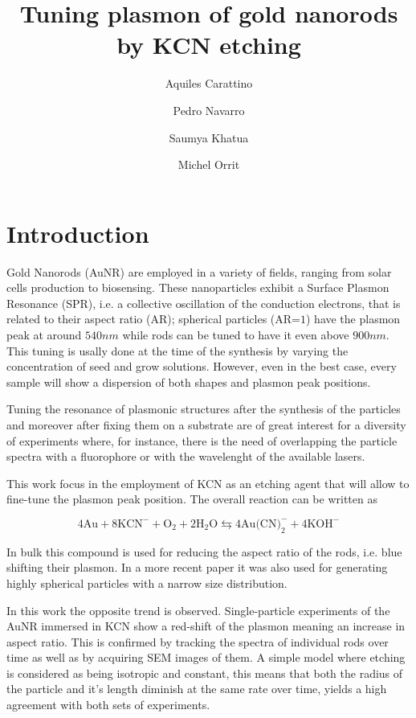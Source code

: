 \documentclass[twocolumn]{article}
\title{Tuning plasmon of gold nanorods by KCN etching}
\author{Aquiles Carattino \and Pedro Navarro \and Saumya Khatua \and Michel
Orrit}
\begin{document}
\maketitle
{}

\section{Introduction}
Gold Nanorods (AuNR) are employed in a variety of fields, ranging from solar
cells production\cite{Catchpole:08} to biosensing. These nanoparticles exhibit a
Surface Plasmon Resonance (SPR), i.e. a collective oscillation of the
conduction electrons, that is related to their aspect ratio (AR); spherical
particles (AR=$1$) have the plasmon peak at around $540nm$ while rods can be
tuned to have it even above $900nm$. This tuning is usally done at the time of
the synthesis by varying the concentration of seed and grow solutions. However,
even in the best case, every sample will show a dispersion of both shapes and 
plasmon peak positions. 

Tuning the resonance of plasmonic structures after the synthesis of the
particles and moreover after fixing them on a substrate are of great interest
for a diversity of experiments where, for instance, there is the need of
overlapping the particle spectra with a fluorophore or with the wavelenght of
the available lasers.

This work focus in the employment of KCN as an etching agent that will allow to
fine-tune the plasmon peak position. The overall reaction can be written as 

\begin{equation}
4\textrm{Au} + 8\textrm{KCN}^-+\textrm{O}_2 + 2\textrm{H}_2\textrm{O}
\leftrightarrows 4\textrm{Au(CN)}_2^-+4\textrm{KOH}^-
\end{equation}

In bulk this compound is used for reducing the aspect ratio of the rods, i.e.
blue shifting their plasmon. In a more recent paper it was also used for
generating highly spherical particles with a narrow size distribution. 

In this work the opposite trend is observed. Single-particle experiments of the
AuNR immersed in KCN show a red-shift of the plasmon meaning an increase in
aspect ratio. This is confirmed by tracking the spectra of individual rods over
time as well as by acquiring SEM images of them. A simple model where etching is
considered as being isotropic and constant, this means that both the radius of
the particle and it's length diminish at the same rate over time, yields a high
agreement with both sets of experiments. 
\end{document}
